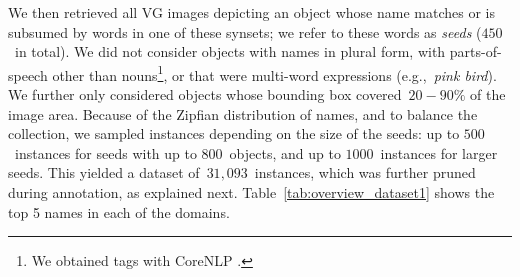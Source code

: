 We then retrieved all VG images depicting an object whose name matches or is subsumed by words in one of these synsets; we refer to these words as \textit{seeds} ($450$\ in total).
We did not consider objects with names in plural form, with parts-of-speech other than nouns\footnote{We obtained tags with CoreNLP \cite{manning2014stanford}.}, or that were multi-word expressions (e.g.,~\textsl{pink bird}). 
We further only considered objects whose bounding box covered~\mbox{$20-90\%$} of the image area.
Because of the Zipfian distribution of names, and to balance the collection, we sampled instances depending on the size of the seeds: up to $500$\ instances for seeds with up to $800$\ objects, and up to $1000$\ instances for larger seeds. This yielded a dataset of\ $31,093$~instances, which was further pruned during annotation, as explained next.
Table~\ref{tab:overview_dataset1} shows the top 5 \vgenome names in each of the domains.

